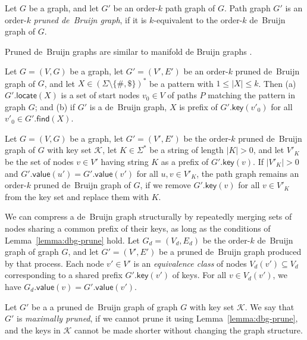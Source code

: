 \documentclass[a4paper,UKenglish]{lipics-v2016}
\newcommand{\set}[1]{\ensuremath{\{ #1 \}}}
\newcommand{\abs}[1]{\ensuremath{\lvert #1 \rvert}}
\newcommand{\find}{\ensuremath{\mathsf{find}}}
\newcommand{\locate}{\ensuremath{\mathsf{locate}}}
\newcommand{\gkey}{\ensuremath{\mathsf{key}}}
\newcommand{\gvalue}{\ensuremath{\mathsf{value}}}
\newcommand{\kequivalent}[1]{$#1$\nobreakdash-equivalent}
\newcommand{\orderk}[1]{order\nobreakdash-$#1$}
\newcommand{\patternset}{\ensuremath{(\Sigma \setminus \set{\#, \$})^{\ast}}}
\begin{document}
\begin{definition}
Let $G$ be a graph, and let $G'$ be an \orderk{k} path graph of $G$. Path graph $G'$ is an \orderk{k} \emph{pruned de~Bruijn graph}, if it is \kequivalent{k} to the \orderk{k} de~Bruijn graph of $G$.
\end{definition}

Pruned de~Bruijn graphs are similar to manifold de Bruijn graphs \cite{Lin2014}.

\begin{lemma}\label{lemma:dbg-fp}
Let $G = (V, G)$ be a graph, let $G' = (V', E')$ be an \orderk{k} pruned de~Bruijn graph of $G$, and let $X \in \patternset$ be a pattern with $1 \le \abs{X} \le k$. Then
(a) $G'.\locate(X)$ is a set of start nodes $v_{0} \in V$ of paths $P$ matching the pattern in graph $G$; and
(b) if $G'$ is a de~Bruijn graph, $X$ is prefix of $G'.\gkey(v'_{0})$ for all $v'_{0} \in G'.\find(X)$.
\end{lemma}

\begin{lemma}[Pruning]\label{lemma:dbg-prune}
Let $G = (V, G)$ be a graph, let $G' = (V', E')$ be the \orderk{k} pruned de~Bruijn graph of $G$ with key set $\mathcal{K}$, let $K \in \Sigma^{\ast}$ be a string of length $\abs{K} > 0$, and let $V'_{K}$ be the set of nodes $v \in V'$ having string $K$ as a prefix of $G'.\gkey(v)$. If $\abs{V'_{K}} > 0$ and $G'.\gvalue(u') = G'.\gvalue(v')$ for all $u, v \in V'_{K}$, the path graph remains an \orderk{k} pruned de~Bruijn graph of $G$, if we remove $G'.\gkey(v)$ for all $v \in V'_{K}$ from the key set and replace them with $K$.
\end{lemma}

We can compress a de~Bruijn graph structurally by repeatedly merging sets of nodes sharing a common prefix of their keys, as long as the conditions of Lemma~\ref{lemma:dbg-prune} hold. Let $G_{d} = (V_{d}, E_{d})$ be the \orderk{k} de~Bruijn graph of graph $G$, and let $G' = (V', E')$ be a pruned de~Bruijn graph produced by that process. Each node $v' \in V'$ is an \emph{equivalence class} of nodes $V_{d}(v') \subseteq V_{d}$ corresponding to a shared prefix $G'.\gkey(v')$ of keys. For all $v \in V_{d}(v')$, we have $G_{d}.\gvalue(v) = G'.\gvalue(v')$.

\begin{definition}
Let $G'$ be a a pruned de~Bruijn graph of graph $G$ with key set $\mathcal{K}$. We say that $G'$ is \emph{maximally pruned}, if we cannot prune it using Lemma~\ref{lemma:dbg-prune}, and the keys in $\mathcal{K}$ cannot be made shorter without changing the graph structure.
\end{definition}
\end{document}
